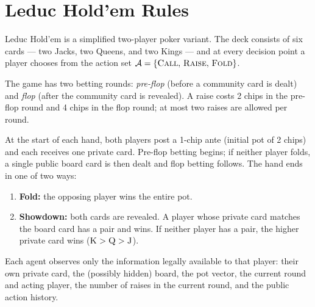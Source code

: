 %

\appendix

\section{Leduc Hold'em Rules}
\label{app:rules}

Leduc Hold'em is a simplified two-player poker variant. The deck consists of
six cards --- two Jacks, two Queens, and two Kings --- and at every decision
point a player chooses from the action set
$\mathcal{A} = \{\textsc{Call},\,\textsc{Raise},\,\textsc{Fold}\}$.

The game has two betting rounds: \emph{pre-flop} (before a community card
is dealt) and \emph{flop} (after the community card is revealed). A raise
costs 2 chips in the pre-flop round and 4 chips in the flop round; at most
two raises are allowed per round.

At the start of each hand, both players post a 1-chip ante (initial pot of
2 chips) and each receives one private card. Pre-flop betting begins; if
neither player folds, a single public board card is then dealt and flop
betting follows. The hand ends in one of two ways:
\begin{enumerate}
  \item \textbf{Fold:} the opposing player wins the entire pot.
  \item \textbf{Showdown:} both cards are revealed. A player whose private
        card matches the board card has a pair and wins. If neither player
        has a pair, the higher private card wins
        ($\textsc{K} > \textsc{Q} > \textsc{J}$).
\end{enumerate}
Each agent observes only the information legally available to that player:
their own private card, the (possibly hidden) board, the pot vector, the
current round and acting player, the number of raises in the current
round, and the public action history.

